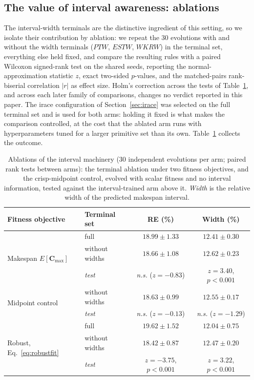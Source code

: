 \documentclass[review,authoryear,11pt]{elsarticle}
\begin{document}
\subsection{The value of interval awareness: ablations}
\label{sec:ablation}
The interval-width terminals are the distinctive ingredient of this
setting, so we isolate their contribution by ablation: we repeat the
30 evolutions with and
without the width terminals ($\mathit{PTW}$, $\mathit{ESTW}$,
$\mathit{WKRW}$) in the terminal set, everything else held fixed, and
compare the resulting rules with a paired Wilcoxon signed-rank test on
the shared seeds, reporting the normal-approximation statistic $z$,
exact two-sided $p$-values, and the matched-pairs rank-biserial
correlation $|r|$ as effect size. Holm's correction across the
tests of Table~\ref{tab:ablation}, and across each later family of
comparisons, changes no verdict reported in this paper. The irace configuration of
Section~\ref{sec:irace} was selected on the full terminal set and is used
for both arms: holding it fixed is what makes the comparison controlled,
at the cost that the ablated arm runs with hyperparameters tuned for a
larger primitive set than its own. Table~\ref{tab:ablation} collects the outcome.

\begin{table}[t]
\centering\small
\caption{Ablations of the interval machinery (30 independent evolutions
per arm; paired rank tests between arms): the terminal ablation under
two fitness objectives, and the crisp-midpoint control, evolved with
scalar fitness and no interval information, tested against the
interval-trained arm above it. \emph{Width} is the relative width of
the predicted makespan interval.}
\label{tab:ablation}
\setlength{\tabcolsep}{4pt}
\begin{tabular}{llcc}
\toprule
Fitness objective & Terminal set & RE (\%) & Width (\%) \\
\midrule
\multirow{3}{*}{Makespan $E[\mathbf{C}_{\max}]$}
 & full & $18.99 \pm 1.33$ & $12.41 \pm 0.30$ \\
 & without widths & $18.66 \pm 1.08$ & $12.62 \pm 0.23$ \\
 & \textit{test} & \textit{n.s.} ($z=-0.83$) & $z=3.40$, $p<0.001$ \\
\midrule
\multirow{2}{*}{Midpoint control}
 & without widths & $18.63 \pm 0.99$ & $12.55 \pm 0.17$ \\
 & \textit{test} & \textit{n.s.} ($z=-0.13$) & \textit{n.s.} ($z=-1.29$) \\
\midrule
\multirow{3}{*}{Robust, Eq.~\eqref{eq:robustfit}}
 & full & $19.62 \pm 1.52$ & $12.04 \pm 0.75$ \\
 & without widths & $18.42 \pm 0.87$ & $12.47 \pm 0.20$ \\
 & \textit{test} & $z=-3.75$, $p<0.001$ & $z=3.22$, $p<0.001$ \\
\bottomrule
\end{tabular}
\end{table}
\end{document}
